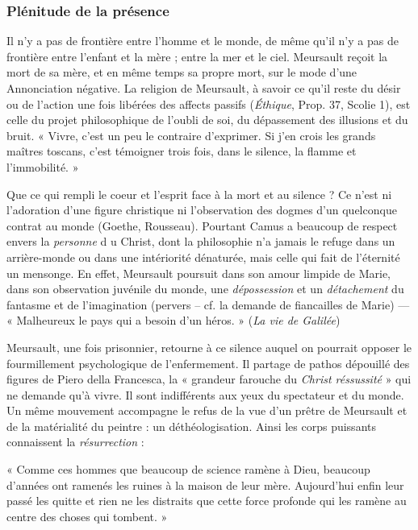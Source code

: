 \documentclass[11pt]{amsart}
\begin{document}
\subsubsection{Plénitude de la présence}Il n'y a pas de frontière entre l'homme et le monde, de même qu'il n'y a pas de frontière entre l'enfant et la mère ; entre la mer et le ciel. Meursault reçoit la mort de sa mère, et en même temps sa propre mort, sur le mode d'une Annonciation négative. La religion de Meursault, à savoir ce qu'il reste du désir ou de l'action une fois libérées des affects passifs (\textsl{\'Ethique}, Prop. 37, Scolie 1), est celle du projet philosophique de l'oubli de soi, du dépassement des illusions et du bruit. « Vivre, c'est un peu le contraire d'exprimer. Si j'en crois les grands maîtres toscans, c'est témoigner trois fois, dans le silence, la flamme et l'immobilité. » 

Que ce qui rempli le coeur et l'esprit face à la mort et au silence ? Ce n'est ni l'adoration d'une figure christique ni l'observation des dogmes d'un quelconque contrat au monde (Goethe, Rousseau). Pourtant Camus a beaucoup de respect envers la \textit{personne} d u Christ, dont la philosophie n'a jamais le refuge dans un arrière-monde ou dans une intériorité dénaturée, mais celle qui fait de l'éternité un mensonge. En effet, Meursault poursuit dans son amour limpide de Marie, dans son observation juvénile du monde, une \textit{dépossession} et un \textit{détachement} du fantasme et de l'imagination (pervers – cf. la demande de fiancailles de Marie) — « Malheureux le pays qui a besoin d'un héros. » (\textsl{La vie de Galilée})

Meursault, une fois prisonnier, retourne à ce silence auquel on pourrait opposer le fourmillement psychologique de l'enfermement. Il partage de pathos dépouillé des figures de Piero della Francesca, la « grandeur farouche du \textsl{Christ réssussité} » qui ne demande qu'à vivre. Il sont indifférents aux yeux du spectateur et du monde. Un même mouvement accompagne le refus de la vue d'un prêtre de Meursault et de la matérialité du peintre : un déthéologisation. Ainsi les corps puissants connaissent la \textit{résurrection} :
\begin{center}
« Comme ces hommes que beaucoup de science ramène à Dieu, beaucoup d'années ont ramenés les ruines à la maison de leur mère. Aujourd'hui enfin leur passé les quitte et rien ne les distraits que cette force profonde qui les ramène au centre des choses qui tombent. » 
\end{center}
\vspace{5pt}
\end{document}
